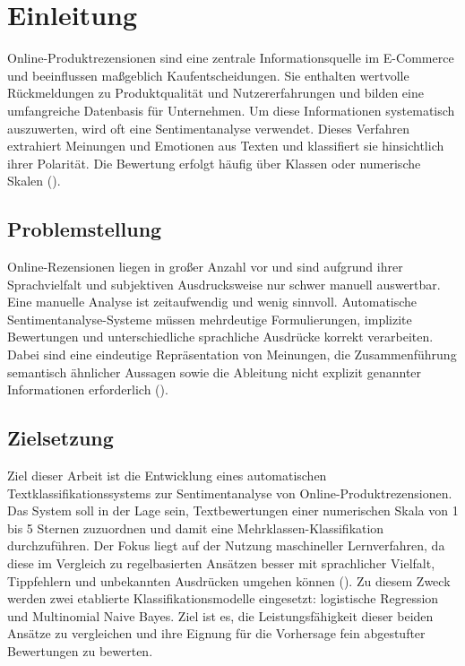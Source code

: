 \chapter{Einleitung}
Online-Produktrezensionen sind eine zentrale Informationsquelle im E-Commerce und 
beeinflussen maßgeblich Kaufentscheidungen. Sie enthalten wertvolle Rückmeldungen 
zu Produktqualität und Nutzererfahrungen und bilden eine umfangreiche Datenbasis 
für Unternehmen. Um diese Informationen systematisch auszuwerten, wird oft eine
Sentimentanalyse verwendet. Dieses Verfahren extrahiert Meinungen und Emotionen
aus Texten und klassifiert sie hinsichtlich ihrer Polarität.
Die Bewertung erfolgt häufig über Klassen oder numerische 
Skalen (\cite{qualtrics2024}).

\section{Problemstellung}
Online-Rezensionen liegen in großer Anzahl vor und sind aufgrund ihrer 
Sprachvielfalt und subjektiven Ausdrucksweise nur schwer manuell auswertbar. Eine 
manuelle Analyse ist zeitaufwendig und wenig sinnvoll.
Automatische Sentimentanalyse-Systeme müssen mehrdeutige Formulierungen, implizite 
Bewertungen und unterschiedliche sprachliche Ausdrücke korrekt verarbeiten. Dabei 
sind eine eindeutige Repräsentation von Meinungen, die Zusammenführung semantisch 
ähnlicher Aussagen sowie die Ableitung nicht explizit genannter Informationen 
erforderlich (\cite{jurafsky2023}).

\section{Zielsetzung}
Ziel dieser Arbeit ist die Entwicklung eines automatischen Textklassifikationssystems 
zur Sentimentanalyse von Online-Produktrezensionen. Das System soll in der Lage sein, 
Textbewertungen einer numerischen Skala von 1 bis 5 Sternen zuzuordnen und damit eine 
Mehrklassen-Klassifikation durchzuführen. Der Fokus liegt auf der Nutzung 
maschineller Lernverfahren, da diese im Vergleich zu regelbasierten Ansätzen besser 
mit sprachlicher Vielfalt, Tippfehlern und unbekannten Ausdrücken umgehen können 
(\cite{jetbrains2025}).
Zu diesem Zweck werden zwei etablierte Klassifikationsmodelle eingesetzt: 
logistische Regression und Multinomial Naive Bayes. Ziel ist es, die 
Leistungsfähigkeit dieser beiden Ansätze zu vergleichen und ihre 
Eignung für die Vorhersage fein abgestufter Bewertungen zu bewerten.

